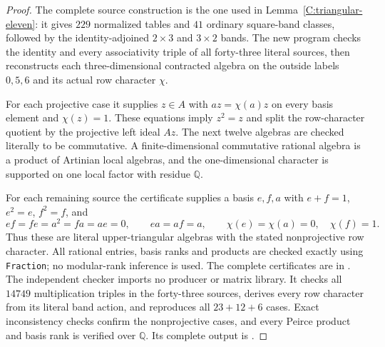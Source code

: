 \begin{proof}
The complete source construction is the one used in
Lemma~\ref{C:triangular-eleven}: it gives $229$ normalized
tables and $41$ ordinary square-band classes, followed by
the identity-adjoined $2\times3$ and $3\times2$ bands.
The new program
checks the identity and every associativity triple of all
forty-three literal sources, then reconstructs each
three-dimensional contracted algebra on the outside
labels $0,5,6$ and its actual row character $\chi$.

For each projective case it supplies $z\in A$ with
$az=\chi(a)z$ on every basis element and $\chi(z)=1$.
These equations imply $z^2=z$ and split the row-character
quotient by the projective left ideal $Az$.
The next twelve algebras are checked literally to be
commutative.  A finite-dimensional commutative rational
algebra is a product of Artinian local algebras, and the
one-dimensional character is supported on one local factor
with residue $\mathbb Q$.

For each remaining source the certificate supplies a
basis $e,f,a$ with $e+f=1$, $e^2=e$, $f^2=f$, and
\[
 ef=fe=a^2=fa=ae=0,\qquad ea=af=a,
 \qquad \chi(e)=\chi(a)=0,\quad\chi(f)=1.
\]
Thus these are literal upper-triangular algebras with the
stated nonprojective row character.  All rational entries,
basis ranks and products are checked exactly using
\texttt{Fraction}; no modular-rank inference is used.
The complete certificates are in
.
The independent checker
imports no producer or matrix library.  It checks all
$14749$ multiplication triples in the forty-three
sources, derives every row character from its literal
band action, and reproduces all $23+12+6$ cases.
Exact inconsistency checks confirm the nonprojective
cases, and every Peirce product and basis rank is
verified over $\mathbb Q$.  Its complete output is
.
\end{proof}

